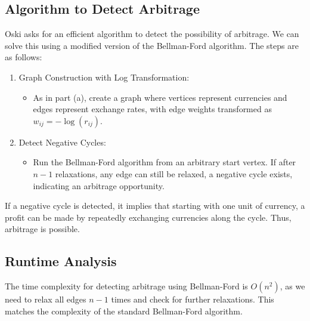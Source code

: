 \documentclass[11pt]{article}
\begin{document}
\subsection*{Algorithm to Detect Arbitrage}

Oski asks for an efficient algorithm to detect the possibility of arbitrage. We can solve this using a modified version of the Bellman-Ford algorithm. The steps are as follows:

\begin{enumerate}
    \item Graph Construction with Log Transformation:
    \begin{itemize}
        \item As in part (a), create a graph where vertices represent currencies and edges represent exchange rates, with edge weights transformed as \( w_{ij} = -\log(r_{ij}) \).
    \end{itemize}
    
    \item Detect Negative Cycles:
    \begin{itemize}
        \item Run the Bellman-Ford algorithm from an arbitrary start vertex. If after \( n-1 \) relaxations, any edge can still be relaxed, a negative cycle exists, indicating an arbitrage opportunity.
    \end{itemize}
\end{enumerate}

If a negative cycle is detected, it implies that starting with one unit of currency, a profit can be made by repeatedly exchanging currencies along the cycle. Thus, arbitrage is possible.

\subsection*{Runtime Analysis}

The time complexity for detecting arbitrage using Bellman-Ford is \( O(n^2) \), as we need to relax all edges \( n-1 \) times and check for further relaxations. This matches the complexity of the standard Bellman-Ford algorithm.
\end{document}
